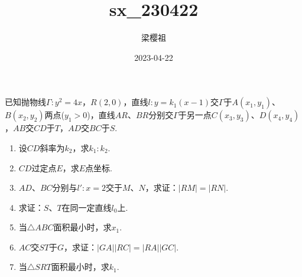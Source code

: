 \documentclass[UTF8, 12pt, a4paper]{ctexart}
\title{sx_230422}
\author{梁樱祖}
\date{2023-04-22}
\begin{document}
已知抛物线$\Gamma:y^2=4x$，$R\left(2,0 \right)$，直线$l:y=k_1\left(x-1 \right)$交$\Gamma$于$A\left(x_1,y_1 \right)$、$B\left(x_2,y_2 \right)$两点($y_1>0$)，直线$AR$、$BR$分别交$\Gamma$于另一点$C\left(x_3,y_3 \right)$、$D\left(x_4,y_4 \right)$，$AB$交$CD$于$T$，$AD$交$BC$于$S$.
\begin{enumerate}[itemsep=0pt, partopsep=0pt, parsep=\parskip, topsep=0pt]
\item 设$CD$斜率为$k_2$，求$k_1:k_2$.
\item $CD$过定点$E$，求$E$点坐标.
\item $AD$、$BC$分别与$l':x=2$交于$M$、$N$，求证：$\left|RM \right|=\left|RN \right|$.
\item 求证：$S$、$T$在同一定直线$l_0$上.
\item 当$\triangle ABC$面积最小时，求$x_1$.
\item $AC$交$ST$于$G$，求证：$\left|GA \right|\left|RC \right|=\left|RA \right|\left|GC \right|$.
\item 当$\triangle SRT$面积最小时，求$k_1$.
\end{enumerate}
\end{document}
